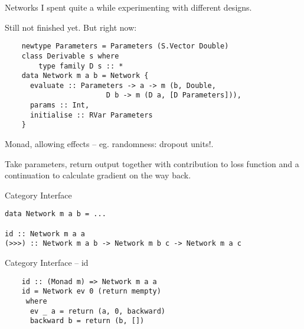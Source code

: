 \documentclass[10pt]{beamer}
\begin{document}
\begin{frame}[fragile]{Networks}
  I spent quite a while experimenting with different designs.

  Still not finished yet. But right now:

  \begin{verbatim}
    newtype Parameters = Parameters (S.Vector Double)
    class Derivable s where
        type family D s :: *
    data Network m a b = Network {
      evaluate :: Parameters -> a -> m (b, Double,
                        D b -> m (D a, [D Parameters])),
      params :: Int,
      initialise :: RVar Parameters
    }
  \end{verbatim}

  Monad, allowing effects -- eg. randomness: dropout units!.

  Take parameters, return output together with contribution to loss function and a continuation to calculate gradient on the way back.
\end{frame}




\begin{frame}[fragile]{Category Interface}
  \begin{verbatim}
data Network m a b = ...

id :: Network m a a
(>>>) :: Network m a b -> Network m b c -> Network m a c
  \end{verbatim}
\end{frame}

\begin{frame}[fragile]{Category Interface -- id}
  \begin{verbatim}
    id :: (Monad m) => Network m a a
    id = Network ev 0 (return mempty)
     where
      ev _ a = return (a, 0, backward)
      backward b = return (b, [])
  \end{verbatim}
\end{frame}
\end{document}
